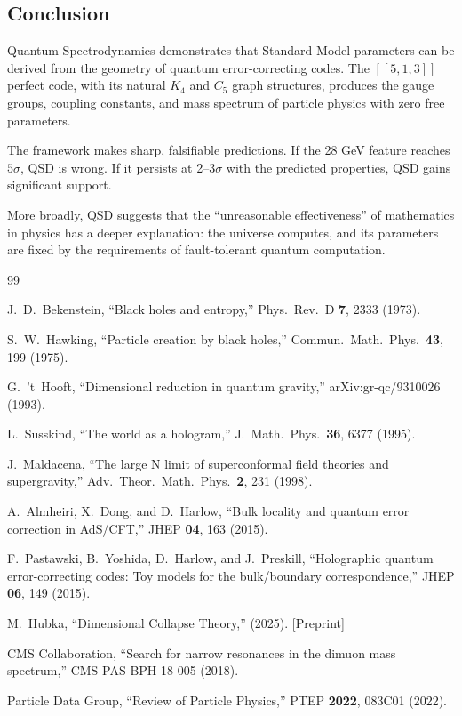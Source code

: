 \documentclass[11pt,a4paper]{article}
\theoremstyle{definition}
\begin{document}
\subsection{Conclusion}

Quantum Spectrodynamics demonstrates that Standard Model parameters can be derived from the geometry of quantum error-correcting codes. The $[[5,1,3]]$ perfect code, with its natural $K_4$ and $C_5$ graph structures, produces the gauge groups, coupling constants, and mass spectrum of particle physics with zero free parameters.

The framework makes sharp, falsifiable predictions. If the 28 GeV feature reaches $5\sigma$, QSD is wrong. If it persists at 2--3$\sigma$ with the predicted properties, QSD gains significant support.

More broadly, QSD suggests that the ``unreasonable effectiveness'' of mathematics in physics has a deeper explanation: the universe computes, and its parameters are fixed by the requirements of fault-tolerant quantum computation.


\begin{thebibliography}{99}

J.~D.~Bekenstein, ``Black holes and entropy,'' Phys.\ Rev.\ D \textbf{7}, 2333 (1973).

S.~W.~Hawking, ``Particle creation by black holes,'' Commun.\ Math.\ Phys.\ \textbf{43}, 199 (1975).

G.~'t~Hooft, ``Dimensional reduction in quantum gravity,'' arXiv:gr-qc/9310026 (1993).

L.~Susskind, ``The world as a hologram,'' J.\ Math.\ Phys.\ \textbf{36}, 6377 (1995).

J.~Maldacena, ``The large N limit of superconformal field theories and supergravity,'' Adv.\ Theor.\ Math.\ Phys.\ \textbf{2}, 231 (1998).

A.~Almheiri, X.~Dong, and D.~Harlow, ``Bulk locality and quantum error correction in AdS/CFT,'' JHEP \textbf{04}, 163 (2015).

F.~Pastawski, B.~Yoshida, D.~Harlow, and J.~Preskill, ``Holographic quantum error-correcting codes: Toy models for the bulk/boundary correspondence,'' JHEP \textbf{06}, 149 (2015).

M.~Hubka, ``Dimensional Collapse Theory,'' (2025). [Preprint]

CMS Collaboration, ``Search for narrow resonances in the dimuon mass spectrum,'' CMS-PAS-BPH-18-005 (2018).

Particle Data Group, ``Review of Particle Physics,'' PTEP \textbf{2022}, 083C01 (2022).

\end{thebibliography}
\end{document}
